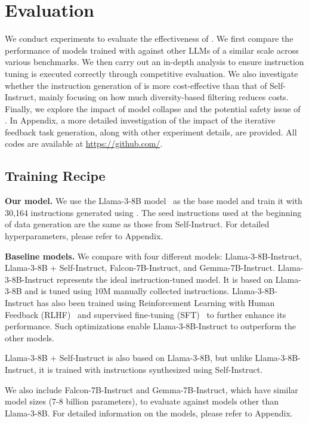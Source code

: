 \section{Evaluation}
\label{sec:eval}

We conduct experiments to evaluate the effectiveness of \ours{}.
We first compare the performance of models trained with \ours{}
against other LLMs of a similar scale across various benchmarks. We then
carry out an in-depth analysis to ensure 
instruction tuning is executed correctly through
competitive evaluation. We also investigate 
whether the instruction generation of \ours{} is more cost-effective 
than that of Self-Instruct, mainly focusing on
how much diversity-based filtering reduces costs. 
Finally, we explore the impact
of model collapse and the potential safety issue of \ours{}.
In Appendix, a more detailed
investigation of the impact of the iterative feedback task generation, along
with other experiment details, are provided. 
All codes are available at \url{https://github.com/}. 

\subsection{Training Recipe}
\textbf{Our model.}
We use the Llama-3-8B model~\cite{llama3} as the base model
and train it with 30,164 instructions generated using \ours{}.
The seed instructions used at
the beginning of data generation are the same as those from
Self-Instruct. 
For detailed hyperparameters, please refer to Appendix.

\noindent \textbf{Baseline models.}
We compare \ours{} with four different models:
Llama-3-8B-Instruct, Llama-3-8B + Self-Instruct,
Falcon-7B-Instruct, and Gemma-7B-Instruct.
Llama-3-8B-Instruct represents the ideal instruction-tuned 
model. It is based on Llama-3-8B and is tuned using 10M 
manually collected instructions.
Llama-3-8B-Instruct has also been trained 
using Reinforcement Learning with Human Feedback (RLHF)~\cite{rlhf} 
and supervised fine-tuning (SFT)~\cite{sft1} to further 
enhance its performance. Such optimizations
enable Llama-3-8B-Instruct to outperform the other models.

Llama-3-8B + Self-Instruct is also based on Llama-3-8B,
but unlike Llama-3-8B-Instruct,
it is trained with instructions synthesized using Self-Instruct.

We also include Falcon-7B-Instruct and Gemma-7B-Instruct,
which have similar model sizes (7-8 billion parameters),
to evaluate \ours{} against models other than Llama-3-8B.
For detailed information on the models, please refer to Appendix.


